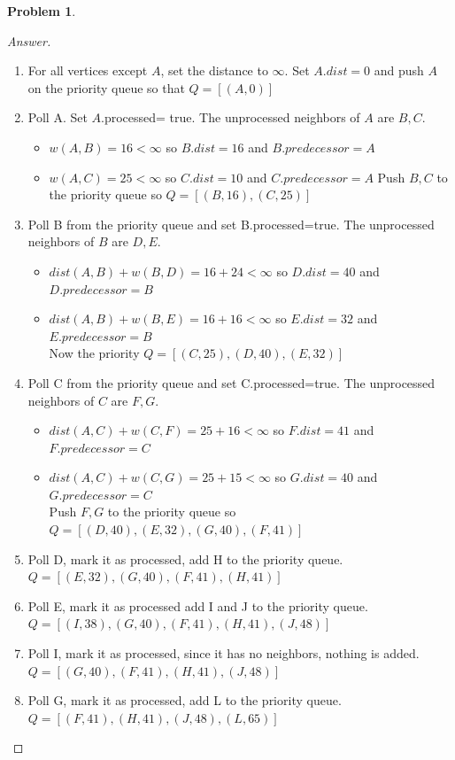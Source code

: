 \documentclass[11pt]{article}
\theoremstyle{definition}
\theoremstyle{definition}
\newtheorem{required}{Problem}
\theoremstyle{definition}
\begin{document}
\begin{required}
\begin{enumerate}[label=(\alph*)]
\begin{proof}[Answer]
\begin{enumerate}[label=\arabic*)]
\item For all vertices except $A$, set the distance to $\infty$. Set $A.dist= 0$ and push $A$ on the priority queue so that $Q= [(A,0)]$
\item Poll A. Set $A$.processed= true. The unprocessed neighbors of $A$ are $B, C$. 
	\begin{itemize}
	\item $w({A,B})= 16 < \infty$ so $B.dist=16$ and $B.predecessor= A$
	\item $w({A,C})= 25 < \infty$ so $C.dist=10$ and $C.predecessor= A$
	Push $B, C$ to the priority queue so $Q= [(B,16), (C,25)]$
	\end{itemize}
\item Poll B from the priority queue and set B.processed=true. The unprocessed neighbors of $B$ are $D, E$.
	\begin{itemize}
	\item $dist(A,B) + w({B,D})= 16+24 < \infty$  so $D.dist=40$ and $D.predecessor= B$\\
	\item $dist(A,B) + w({B,E})= 16+16 < \infty$  so $E.dist=32$ and $E.predecessor= B$\\
	Now the priority $Q= [(C,25), (D,40), (E,32)]$
	\end{itemize}
\item Poll C from the priority queue and set C.processed=true. The unprocessed neighbors of $C$ are $F, G$.
	\begin{itemize}
	\item $dist(A,C) + w({C,F})= 25+16 < \infty $ so $F.dist=41$ and $F.predecessor= C$\\
	\item $dist(A,C) + w({C,G})= 25+15 < \infty $ so $G.dist=40$ and $G.predecessor= C$\\
	Push $F, G$ to the priority queue so $Q= [(D,40), (E,32), (G,40), (F,41)]$
	\end{itemize}
\item Poll D, mark it as processed, add H to the priority queue. $Q= [(E,32), (G,40), (F,41), (H,41)]$
\item Poll E, mark it as processed add I and J to the priority queue. $Q= [(I,38), (G,40), (F,41), (H,41), (J,48)]$
\item Poll I, mark it as processed, since it has no neighbors, nothing is added. $Q= [(G,40), (F,41), (H,41), (J,48)]$
\item Poll G, mark it as processed, add L to the priority queue. $Q= [(F,41), (H,41), (J,48), (L,65)]$

\end{enumerate}
\end{proof}
\end{enumerate}
\end{required}
\end{document}
